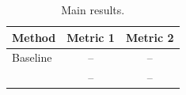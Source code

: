 \begin{table}[t]
  \caption{Main results.}
  \label{tab:main-results}
  \centering
  \begin{tabular}{lcc}
    \toprule
    Method & Metric 1 & Metric 2 \\
    \midrule
    Baseline & -- & -- \\
    \method{} & -- & -- \\
    \bottomrule
  \end{tabular}
\end{table}
